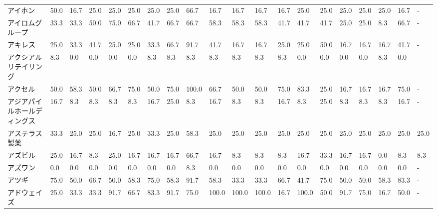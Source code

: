\documentclass[a4paper，11pt]{jsarticle}
\begin{document}
\begin{longtable}[c]{lp{3mm}p{3mm}p{3mm}p{3mm}p{3mm}p{3mm}p{3mm}p{3mm}p{3mm}p{3mm}p{3mm}p{3mm}p{3mm}p{3mm}p{3mm}p{3mm}p{3mm}p{3mm}p{3mm}}
アイホン            &   50.0 &   16.7 &      25.0 &      25.0 &       25.0 &   25.0 &   25.0 &   66.7 &    16.7 &    16.7 &   16.7 &  16.7 &   25.0 &    25.0 &    25.0 &  25.0 &  25.0 &  16.7 &     - \\
アイロムグループ        &   33.3 &   33.3 &      50.0 &      75.0 &       66.7 &   41.7 &   66.7 &   66.7 &    58.3 &    58.3 &   58.3 &  41.7 &   41.7 &    41.7 &    25.0 &  25.0 &   8.3 &  66.7 &     - \\
アキレス            &   25.0 &   33.3 &      41.7 &      25.0 &       25.0 &   33.3 &   66.7 &   91.7 &    41.7 &    16.7 &   16.7 &  25.0 &   25.0 &    50.0 &    16.7 &  16.7 &  16.7 &  41.7 &     - \\
アクシアル　リテイリング    &    8.3 &    0.0 &       0.0 &       0.0 &        0.0 &    8.3 &    8.3 &    8.3 &     8.3 &     8.3 &    8.3 &   8.3 &    0.0 &     0.0 &     0.0 &   0.0 &   8.3 &   0.0 &     - \\
アクセル            &   50.0 &   58.3 &      50.0 &      66.7 &       75.0 &   50.0 &   75.0 &  100.0 &    66.7 &    50.0 &   50.0 &  75.0 &   83.3 &    25.0 &    16.7 &  16.7 &  16.7 &  75.0 &     - \\
アジアパイルホールディングス  &   16.7 &    8.3 &       8.3 &       8.3 &        8.3 &   16.7 &   25.0 &    8.3 &    16.7 &     8.3 &    8.3 &  16.7 &    8.3 &    25.0 &     8.3 &   8.3 &   8.3 &  16.7 &     - \\
アステラス製薬         &   33.3 &   25.0 &      25.0 &      16.7 &       25.0 &   33.3 &   25.0 &   58.3 &    25.0 &    25.0 &   25.0 &  25.0 &   25.0 &    25.0 &    25.0 &  25.0 &  25.0 &  25.0 &  25.0 \\
アズビル            &   25.0 &   16.7 &       8.3 &      25.0 &       16.7 &   16.7 &   16.7 &   66.7 &    16.7 &     8.3 &    8.3 &   8.3 &   16.7 &    33.3 &    16.7 &  16.7 &   0.0 &   8.3 &   8.3 \\
アズワン            &    0.0 &    0.0 &       0.0 &       0.0 &        0.0 &    0.0 &    0.0 &    8.3 &     0.0 &     0.0 &    0.0 &   0.0 &    0.0 &     0.0 &     0.0 &   0.0 &   0.0 &   0.0 &     - \\
アツギ             &   75.0 &   50.0 &      66.7 &      50.0 &       58.3 &   75.0 &   58.3 &   91.7 &    58.3 &    33.3 &   33.3 &  66.7 &   41.7 &    75.0 &    50.0 &  50.0 &  58.3 &  83.3 &     - \\
アドウェイズ          &   25.0 &   33.3 &      33.3 &      91.7 &       66.7 &   83.3 &   91.7 &   75.0 &   100.0 &   100.0 &  100.0 &  16.7 &  100.0 &    50.0 &    91.7 &  75.0 &  16.7 &  50.0 &     - \\

\end{longtable}
\end{document}
